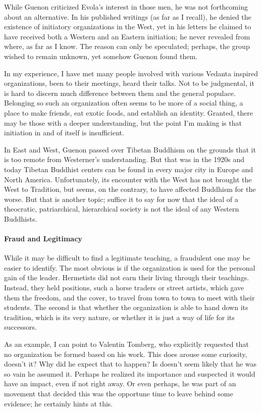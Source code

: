 While Guenon criticized Evola's interest in those men, he was not forthcoming about an alternative. In his published writings (as far as I recall), he denied the existence of initiatory organizations in the West, yet in his letters he claimed to have received both a Western and an Eastern initiation; he never revealed from where, as far as I know. The reason can only be speculated; perhaps, the group wished to remain unknown, yet somehow Guenon found them.

In my experience, I have met many people involved with various Vedanta inspired organizations, been to their meetings, heard their talks. Not to be judgmental, it is hard to discern much difference between them and the general populace. Belonging so such an organization often seems to be more of a social thing, a place to make friends, eat exotic foods, and establish an identity. Granted, there may be those with a deeper understanding, but the point I'm making is that initiation in and of itself is insufficient.

In East and West, Guenon passed over Tibetan Buddhism on the grounds that it is too remote from Westerner's understanding. But that was in the 1920s and today Tibetan Buddhist centers can be found in every major city in Europe and North America. Unfortunately, its encounter with the West has not brought the West to Tradition, but seems, on the contrary, to have affected Buddhism for the worse. But that is another topic; suffice it to say for now that the ideal of a theocratic, patriarchical, hierarchical society is not the ideal of any Western Buddhists.

\paragraph{Fraud and Legitimacy}


While it may be difficult to find a legitimate teaching, a fraudulent one may be easier to identify. The most obvious is if the organization is used for the personal gain of the leader. Hermetists did not earn their living through their teachings. Instead, they held positions, such a horse traders or street artists, which gave them the freedom, and the cover, to travel from town to town to meet with their students. The second is that whether the organization is able to hand down its tradition, which is its very nature, or whether it is just a way of life for its successors.

As an example, I can point to Valentin Tomberg, who explicitly requested that no organization be formed based on his work. This does arouse some curiosity, doesn't it? Why did he expect that to happen? Is doesn't seem likely that he was so vain he assumed it. Perhaps he realized its importance and suspected it would have an impact, even if not right away. Or even perhaps, he was part of an movement that decided this was the opportune time to leave behind some evidence; he certainly hints at this.

